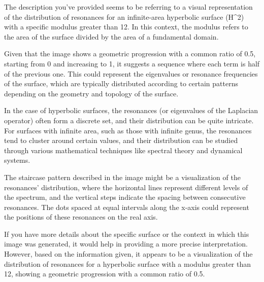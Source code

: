 The description you've provided seems to be referring to a visual representation of the distribution of resonances for an infinite-area hyperbolic surface (H^2) with a specific modulus greater than 12. In this context, the modulus refers to the area of the surface divided by the area of a fundamental domain.

Given that the image shows a geometric progression with a common ratio of 0.5, starting from 0 and increasing to 1, it suggests a sequence where each term is half of the previous one. This could represent the eigenvalues or resonance frequencies of the surface, which are typically distributed according to certain patterns depending on the geometry and topology of the surface.

In the case of hyperbolic surfaces, the resonances (or eigenvalues of the Laplacian operator) often form a discrete set, and their distribution can be quite intricate. For surfaces with infinite area, such as those with infinite genus, the resonances tend to cluster around certain values, and their distribution can be studied through various mathematical techniques like spectral theory and dynamical systems.

The staircase pattern described in the image might be a visualization of the resonances' distribution, where the horizontal lines represent different levels of the spectrum, and the vertical steps indicate the spacing between consecutive resonances. The dots spaced at equal intervals along the x-axis could represent the positions of these resonances on the real axis.

If you have more details about the specific surface or the context in which this image was generated, it would help in providing a more precise interpretation. However, based on the information given, it appears to be a visualization of the distribution of resonances for a hyperbolic surface with a modulus greater than 12, showing a geometric progression with a common ratio of 0.5.